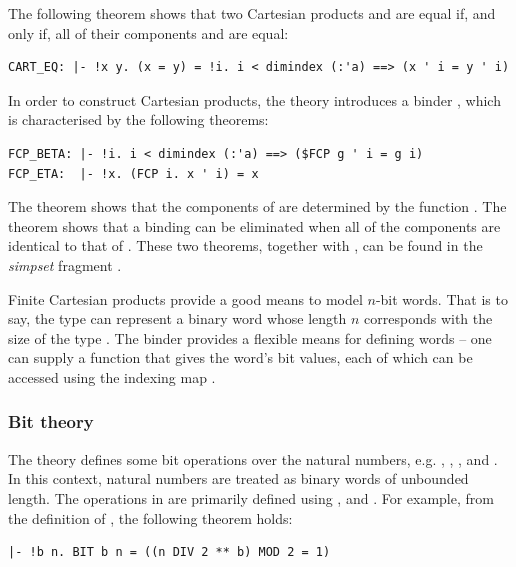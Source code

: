 {The following theorem shows that two Cartesian products  and
 are equal if, and only if, all of their components  and
 are equal:
\begin{hol}
\begin{verbatim}
CART_EQ: |- !x y. (x = y) = !i. i < dimindex (:'a) ==> (x ' i = y ' i)
\end{verbatim}
\end{hol}

In order to construct Cartesian products, the theory  introduces a
binder , which is characterised by the following theorems:
\begin{hol}
\begin{verbatim}
FCP_BETA: |- !i. i < dimindex (:'a) ==> ($FCP g ' i = g i)
FCP_ETA:  |- !x. (FCP i. x ' i) = x
\end{verbatim}
\end{hol}
The theorem  shows that the components of  are
determined by the function .  The theorem
 shows that a binding can be eliminated when all of the components
are identical to that of .
These two theorems, together with , can be found in the
\emph{simpset} fragment .

Finite Cartesian products provide a good means to model $n$-bit words.  That is
to say, the type  can represent a binary word whose length $n$
corresponds with the size of the type .  The binder 
provides a flexible means for defining words -- one can supply a function
 that gives the word's bit values, each of which can be accessed using the indexing map .

\subsubsection{Bit theory}

The theory  defines some bit operations over the natural numbers,
e.g. , , ,  and
. In this context, natural numbers are treated as binary words of
unbounded length.  The operations in  are primarily defined using ,  and .  For example, from the definition of , the following theorem holds:
\begin{hol}
\begin{verbatim}
|- !b n. BIT b n = ((n DIV 2 ** b) MOD 2 = 1)
\end{verbatim}
\end{hol}

}

